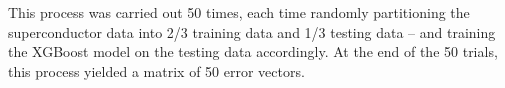 \documentclass[oneside,12pt]{amsart}
\begin{document}
 This process was carried out 50 times, each time randomly partitioning the superconductor data into 2/3 training data and 1/3 testing data -- and training the XGBoost model on the testing data accordingly. At the end of the 50 trials, this process yielded a matrix of 50 error vectors.
 
 
\end{document}

